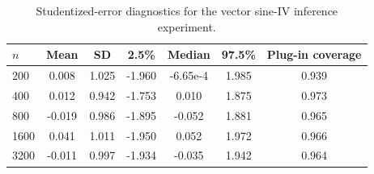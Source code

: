 \begin{table}[t]
\centering
\small
\setlength{\tabcolsep}{5pt}
\caption{Studentized-error diagnostics for the vector sine-IV inference experiment.}
\label{tab:generated-iv-studentized}
\begin{tabular}{lcccccc}
\toprule
$n$ & Mean & SD & 2.5\% & Median & 97.5\% & Plug-in coverage \\
\midrule
200 & 0.008 & 1.025 & -1.960 & -6.65e-4 & 1.985 & 0.939 \\
400 & 0.012 & 0.942 & -1.753 & 0.010 & 1.875 & 0.973 \\
800 & -0.019 & 0.986 & -1.895 & -0.052 & 1.881 & 0.965 \\
1600 & 0.041 & 1.011 & -1.950 & 0.052 & 1.972 & 0.966 \\
3200 & -0.011 & 0.997 & -1.934 & -0.035 & 1.942 & 0.964 \\
\bottomrule
\end{tabular}
\end{table}
